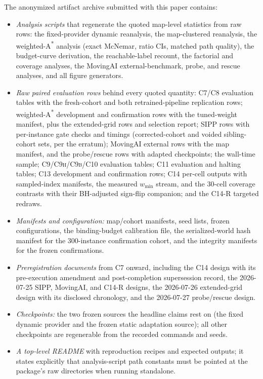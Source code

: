 \documentclass[letterpaper]{article} %
\newcommand{\stage}[1]{\textsc{#1}}
\begin{document}
The anonymized artifact archive submitted with this paper contains:
\begin{itemize}
    \item \emph{Analysis scripts} that regenerate the quoted map-level statistics from raw rows: the fixed-provider dynamic reanalysis, the map-clustered reanalysis, the weighted-A\textsuperscript{*} analysis (exact McNemar, ratio CIs, matched path quality), the budget-curve derivation, the reachable-label recount, the factorial and coverage analyses, the MovingAI external-benchmark, probe, and rescue analyses, and all figure generators.
    \item \emph{Raw paired evaluation rows} behind every quoted quantity: \stage{C7}/\stage{C8} evaluation tables with the fresh-cohort and both retrained-pipeline replication rows; weighted-A\textsuperscript{*} development and confirmation rows with the tuned-weight manifest, plus the extended-grid rows and selection report; SIPP rows with per-instance gate checks and timings (corrected-cohort and voided sibling-cohort sets, per the erratum); MovingAI external rows with the map manifest, and the probe/rescue rows with adapted checkpoints; the wall-time sample; \stage{C9}/\stage{C9h}/\stage{C9b}/\stage{C10} evaluation tables; \stage{C11} evaluation and halting tables; \stage{C13} development and confirmation rows; \stage{C14} per-cell outputs with sampled-index manifests, the measured $w_{\min}$ stream, and the 30-cell coverage contrasts with their BH-adjusted sign-flip companion; and the \stage{C14-R} targeted redraws.
    \item \emph{Manifests and configuration:} map/cohort manifests, seed lists, frozen configurations, the binding-budget calibration file, the serialized-world hash manifest for the 300-instance confirmation cohort, and the integrity manifests for the frozen confirmations.
    \item \emph{Preregistration documents} from \stage{C7} onward, including the \stage{C14} design with its pre-execution amendment and post-completion supersession record, the 2026-07-25 SIPP, MovingAI, and \stage{C14-R} designs, the 2026-07-26 extended-grid design with its disclosed chronology, and the 2026-07-27 probe/rescue design.
    \item \emph{Checkpoints:} the two frozen sources the headline claims rest on (the fixed dynamic provider and the frozen static adaptation source); all other checkpoints are regenerable from the recorded commands and seeds.
    \item \emph{A top-level README} with reproduction recipes and expected outputs; it states explicitly that analysis-script path constants must be pointed at the package's raw directories when running standalone.
\end{itemize}



\end{document}
